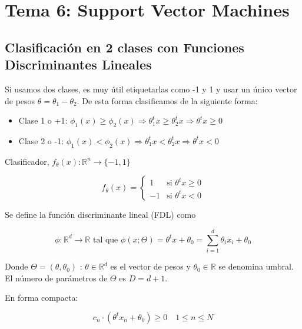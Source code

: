 \chapter{Tema 6: Support Vector Machines}

\section{Clasificación en 2 clases con Funciones Discriminantes Lineales}

Si usamos dos clases, es muy útil etiquetarlas como -1 y 1 y usar
un único vector de pesos $\theta = \theta_1 - \theta_2$.
De esta forma clasificamos de la siguiente forma:

\begin{itemize}
    \item Clase 1 o +1: $\phi_1(x) \geq \phi_2(x) \Rightarrow \theta_1^t x \geq \theta_2^t x \Rightarrow \theta^t x \geq 0$
    \item Clase 2 o -1: $\phi_1(x) < \phi_2(x) \Rightarrow \theta_1^t x < \theta_2^t x \Rightarrow \theta^t x < 0$
\end{itemize}

Clasificador, $f_{\theta}(x) : \mathbb{R}^n \rightarrow \{-1, 1\}$

\begin{equation*}
    f_{\theta}(x) =
    \begin{cases}
        1 & \text{si } \theta^t x \geq 0 \\
        -1 & \text{si } \theta^t x < 0
    \end{cases}
\end{equation*}

Se define la función discriminante lineal (FDL) como

\begin{equation*}
    \phi: \mathbb{R}^d \rightarrow \mathbb{R} \text{ tal que } 
    \phi(x; \Theta) = \theta^t x + \theta_0 = 
    \sum_{i=1}^{d} \theta_i x_i + \theta_0
\end{equation*}

Donde $\Theta = (\theta, \theta_0)$ : $\theta \in \mathbb{R}^d$ es el 
vector de pesos y $\theta_0 \in \mathbb{R}$ se denomina umbral.
El número de parámetros de $\Theta$ es $D = d+1$.

En forma compacta:

\begin{equation*}
    c_n \cdot (\theta^t x_n + \theta_0) \geq 0 \quad 1 \leq n \leq N
\end{equation*}

